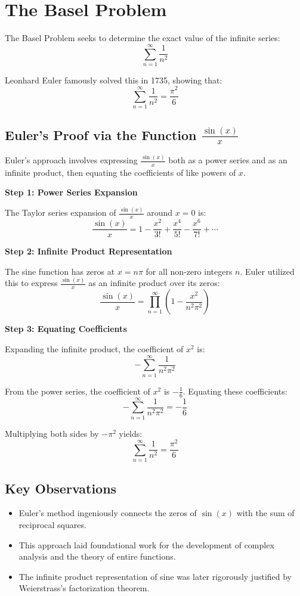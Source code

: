 \newpage
\section{The Basel Problem}

The Basel Problem seeks to determine the exact value of the infinite series:
\[
\sum_{n=1}^{\infty} \frac{1}{n^2}
\]

Leonhard Euler famously solved this in 1735, showing that:
\[
\sum_{n=1}^{\infty} \frac{1}{n^2} = \frac{\pi^2}{6}
\]

\subsection{Euler's Proof via the Function \( \frac{\sin(x)}{x} \)}

Euler's approach involves expressing \( \frac{\sin(x)}{x} \) both as a power series and as an infinite product, then equating the coefficients of like powers of \( x \).
\vspace{\baselineskip}

\textbf{Step 1: Power Series Expansion}

The Taylor series expansion of \( \frac{\sin(x)}{x} \) around \( x = 0 \) is:
\[
\frac{\sin(x)}{x} = 1 - \frac{x^2}{3!} + \frac{x^4}{5!} - \frac{x^6}{7!} + \cdots
\]

\textbf{Step 2: Infinite Product Representation}

The sine function has zeros at \( x = n\pi \) for all non-zero integers \( n \). Euler utilized this to express \( \frac{\sin(x)}{x} \) as an infinite product over its zeros:
\[
\frac{\sin(x)}{x} = \prod_{n=1}^{\infty} \left(1 - \frac{x^2}{n^2\pi^2}\right)
\]

\textbf{Step 3: Equating Coefficients}

Expanding the infinite product, the coefficient of \( x^2 \) is:
\[
-\sum_{n=1}^{\infty} \frac{1}{n^2\pi^2}
\]

From the power series, the coefficient of \( x^2 \) is \( -\frac{1}{6} \). Equating these coefficients:
\[
-\sum_{n=1}^{\infty} \frac{1}{n^2\pi^2} = -\frac{1}{6}
\]

Multiplying both sides by \( -\pi^2 \) yields:
\[
\sum_{n=1}^{\infty} \frac{1}{n^2} = \frac{\pi^2}{6}
\]

\subsection{Key Observations}

\begin{itemize}[label=\(-\)]
    \item Euler's method ingeniously connects the zeros of \( \sin(x) \) with the sum of reciprocal squares.
    \item This approach laid foundational work for the development of complex analysis and the theory of entire functions.
    \item The infinite product representation of sine was later rigorously justified by Weierstrass's factorization theorem.
\end{itemize}
